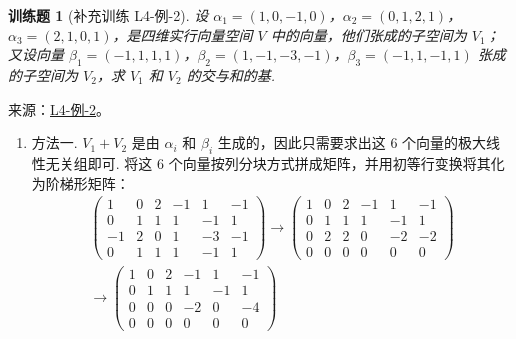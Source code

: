 \documentclass[12pt,fontset=fandol]{ctexart}
\newtheorem{exercise}{训练题}[section]
\begin{document}
\begin{exercise}[补充训练 L4-例-2]\label{prob:L4-例-2}
设 $\alpha_1 = (1, 0, -1, 0)$，$\alpha_2 = (0, 1, 2, 1)$，$\alpha_3 = (2, 1, 0, 1)$，是四维实行向量空间 $V$ 中的向量，他们张成的子空间为 $V_1$；又设向量 $\beta_1 = (-1, 1, 1, 1)$，$\beta_2 = (1, -1, -3, -1)$，$\beta_3 = (-1, 1, -1, 1)$ 张成的子空间为 $V_2$，求 $V_1$ 和 $V_2$ 的交与和的基.
\end{exercise}
\noindent 来源：\href{https://github.com/yhwu-is/Linear-Algebra-Left-Undone/blob/new/%E8%AE%B2%E4%B9%89/%E4%B8%93%E9%A2%98/4%20%E7%BA%BF%E6%80%A7%E7%A9%BA%E9%97%B4%E7%9A%84%E8%BF%90%E7%AE%97.tex}{L4-例-2}。
\begin{solve}
\begin{enumerate}
        \item 方法一.  $V_1 +V_2$ 是由 $\alpha_i$ 和 $\beta_i$ 生成的，因此只需要求出这 $6$ 个向量的极大线性无关组即可. 将这 $6$ 个向量按列分块方式拼成矩阵，并用初等行变换将其化为阶梯形矩阵：
              \begin{align*}
                  \begin{pmatrix}
                      1  & 0 & 2 & -1 & 1  & -1 \\
                      0  & 1 & 1 & 1  & -1 & 1  \\
                      -1 & 2 & 0 & 1  & -3 & -1 \\
                      0  & 1 & 1 & 1  & -1 & 1
                  \end{pmatrix}
                  \xrightarrow{}
                  \begin{pmatrix}
                      1 & 0 & 2 & -1 & 1  & -1 \\
                      0 & 1 & 1 & 1  & -1 & 1  \\
                      0 & 2 & 2 & 0  & -2 & -2 \\
                      0 & 0 & 0 & 0  & 0  & 0
                  \end{pmatrix} \\
                  \xrightarrow{}
                  \begin{pmatrix}
                      1 & 0 & 2 & -1 & 1  & -1 \\
                      0 & 1 & 1 & 1  & -1 & 1  \\
                      0 & 0 & 0 & -2 & 0  & -4 \\
                      0 & 0 & 0 & 0  & 0  & 0
                  \end{pmatrix}
              \end{align*}


\end{enumerate}
\end{solve}
\end{document}
